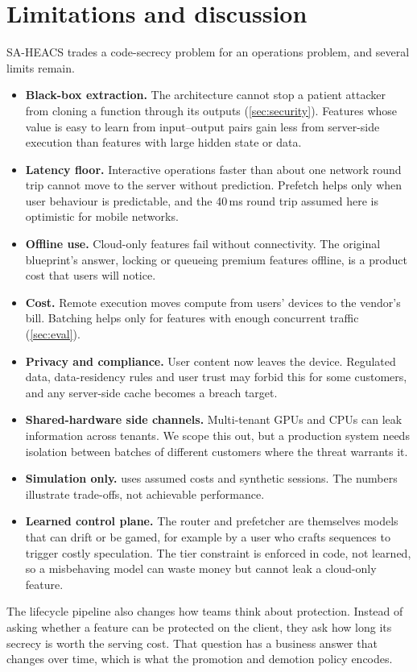 \section{Limitations and discussion}\label{sec:discussion}

SA-HEACS trades a code-secrecy problem for an operations problem, and several limits remain.
\begin{itemize}
  \item \textbf{Black-box extraction.} The architecture cannot stop a patient attacker from
        cloning a function through its outputs (\cref{sec:security}). Features whose value is
        easy to learn from input--output pairs gain less from server-side execution than
        features with large hidden state or data.
  \item \textbf{Latency floor.} Interactive operations faster than about one network round
        trip cannot move to the server without prediction. Prefetch helps only when user
        behaviour is predictable, and the 40\,ms round trip assumed here is optimistic for
        mobile networks.
  \item \textbf{Offline use.} Cloud-only features fail without connectivity. The original
        blueprint's answer, locking or queueing premium features offline, is a product cost
        that users will notice.
  \item \textbf{Cost.} Remote execution moves compute from users' devices to the vendor's
        bill. Batching helps only for features with enough concurrent traffic
        (\cref{sec:eval}).
  \item \textbf{Privacy and compliance.} User content now leaves the device. Regulated data,
        data-residency rules and user trust may forbid this for some customers, and any
        server-side cache becomes a breach target.
  \item \textbf{Shared-hardware side channels.} Multi-tenant GPUs and CPUs can leak
        information across tenants. We scope this out, but a production system needs
        isolation between batches of different customers where the threat warrants it.
  \item \textbf{Simulation only.}  uses assumed costs and synthetic
        sessions. The numbers illustrate trade-offs, not achievable performance.
  \item \textbf{Learned control plane.} The router and prefetcher are themselves models that
        can drift or be gamed, for example by a user who crafts sequences to trigger costly
        speculation. The tier constraint is enforced in code, not learned, so a misbehaving
        model can waste money but cannot leak a cloud-only feature.
\end{itemize}

The lifecycle pipeline also changes how teams think about protection. Instead of asking
whether a feature can be protected on the client, they ask how long its secrecy is worth the
serving cost. That question has a business answer that changes over time, which is what the
promotion and demotion policy encodes.
